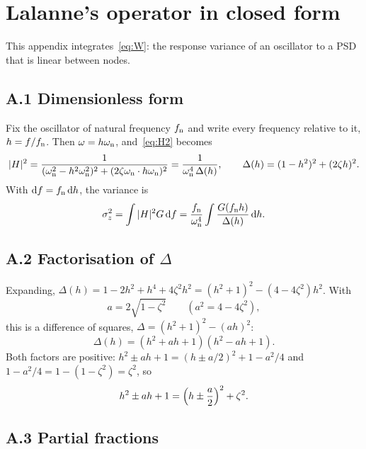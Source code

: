 \section{Lalanne's operator in closed form}\label{app:lalanne}

This appendix integrates~\eqref{eq:W}: the response variance of an oscillator to a PSD that is
linear between nodes.

\subsection*{A.1 Dimensionless form}

Fix the oscillator of natural frequency $f_{\mathrm{n}}$ and write every frequency relative to it, $h = f/f_{\mathrm{n}}$.
Then $\omega = h\omega_{\mathrm{n}}$, and~\eqref{eq:H2} becomes
\begin{equation}
  |H|^2 = \frac{1}{(\omega_{\mathrm{n}}^2-h^2\omega_{\mathrm{n}}^2)^2 + (2\zeta\omega_{\mathrm{n}}\cdot h\omega_{\mathrm{n}})^2} = \frac{1}{\omega_{\mathrm{n}}^4\,\Delta(h)},
  \qquad \Delta(h) = (1-h^2)^2 + (2\zeta h)^2 .
\end{equation}
With $\mathrm{d} f = f_{\mathrm{n}}\,\mathrm{d} h$, the variance is
\begin{equation}\label{eq:A1}
  \sigma_z^2 = \int|H|^2G\,\mathrm{d} f = \frac{f_{\mathrm{n}}}{\omega_{\mathrm{n}}^4}\int\frac{G(f_{\mathrm{n}} h)}{\Delta(h)}\,\mathrm{d} h .
\end{equation}

\subsection*{A.2 Factorisation of $\Delta$}

Expanding, $\Delta(h) = 1 - 2h^2 + h^4 + 4\zeta^2h^2 = (h^2+1)^2 - (4-4\zeta^2)h^2$. With
\begin{equation}
  a = 2\sqrt{1-\zeta^2}\qquad (a^2 = 4-4\zeta^2),
\end{equation}
this is a difference of squares, $\Delta = (h^2+1)^2-(ah)^2$:
\begin{equation}
  \Delta(h) = (h^2+ah+1)(h^2-ah+1).
\end{equation}
Both factors are positive: $h^2\pm ah+1 = (h\pm a/2)^2 + 1 - a^2/4$ and $1-a^2/4 = 1-(1-\zeta^2) =
\zeta^2$, so
\begin{equation}\label{eq:A2}
  h^2\pm ah+1 = \Bigl(h\pm\frac a2\Bigr)^2 + \zeta^2 .
\end{equation}

\subsection*{A.3 Partial fractions}

